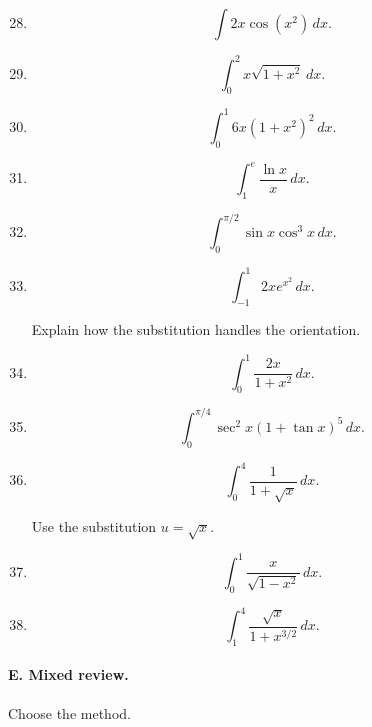 \begin{enumerate}
\setcounter{enumi}{27}

\item

\[
\int 2x\cos(x^2)\,dx.
\]

\item

\[
\int_0^2 x\sqrt{1+x^2}\,dx.
\]

\item

\[
\int_0^1 6x(1+x^2)^2\,dx.
\]

\item

\[
\int_1^e \frac{\ln x}{x}\,dx.
\]

\item

\[
\int_0^{\pi/2} \sin x\cos^3 x\,dx.
\]

\item

\[
\int_{-1}^{1}2xe^{x^2}\,dx.
\]

Explain how the substitution handles the orientation.

\item

\[
\int_0^1 \frac{2x}{1+x^2}\,dx.
\]

\item

\[
\int_0^{\pi/4}\sec^2 x(1+\tan x)^5\,dx.
\]

\item

\[
\int_0^4 \frac{1}{1+\sqrt{x}}\,dx.
\]

Use the substitution \(u=\sqrt{x}\).

\item

\[
\int_{0}^{1} \frac{x}{\sqrt{1-x^2}}\,dx.
\]

\item

\[
\int_{1}^{4} \frac{\sqrt{x}}{1+x^{3/2}}\,dx.
\]

\end{enumerate}

\paragraph{E. Mixed review.}

Choose the method.

